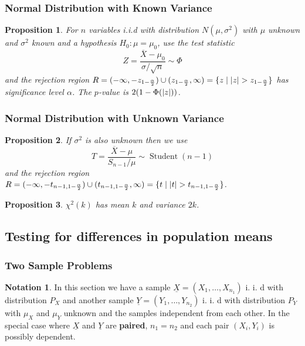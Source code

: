 \documentclass[12pt]{article}
\newtheorem*{prop*}{Proposition}
\theoremstyle{definition}
\newtheorem*{not*}{Notation}
\DeclarePairedDelimiter\abs{\lvert}{\rvert}
\DeclareMathOperator{\Student}{Student}
\begin{document}
\subsubsection{Normal Distribution with Known Variance}

\begin{prop*}
  For $n$ variables i.i.d with distribution $N(\mu, \sigma^2)$ with $\mu$ unknown and $\sigma^2$ known and a hypothesis $H_0 : \mu = \mu_0$, use the test statistic
  $$Z = \frac{\overline{X} - \mu_0}{\sigma / \sqrt{n}} \sim \Phi$$
  and the rejection region $R = (-\infty, -z_{1 - \frac{\alpha}{2}}) \cup (z_{1 - \frac{\alpha}{2}}, \infty) = \{z \mid \abs{z} > z_{1 - \frac{\alpha}{2}}\}$ has significance level $\alpha$.
  The $p$-value is $2(1 - \Phi(\abs{z}))$.
\end{prop*}

\subsubsection{Normal Distribution with Unknown Variance}

\begin{prop*}
  If $\sigma^2$ is also unknown then we use
  $$T = \frac{\overline{X} - \mu}{S_{n - 1} / \mu} \sim \Student(n - 1)$$
  and the rejection region $R = (-\infty, -t_{n - 1, 1 - \frac{\alpha}{2}}) \cup (t_{n - 1, 1 - \frac{\alpha}{2}}, \infty) = \{t \mid \abs{t} > t_{n - 1, 1 - \frac{\alpha}{2}}\}$.
\end{prop*}

\begin{prop*}
  $\chi^2(k)$ has mean $k$ and variance $2k$.
\end{prop*}

\subsection{Testing for differences in population means}

\subsubsection{Two Sample Problems}

\begin{not*}
  In this section we have a sample $\underline{X} = (X_1, \ldots, X_{n_1})$ i. i. d with distribution $P_X$ and another sample $\underline{Y} = (Y_1, \ldots, Y_{n_2})$ i. i. d with distribution $P_Y$ with $\mu_X$ and $\mu_Y$ unknown and the samples independent from each other.
  In the special case where $\underline{X}$ and $\underline{Y}$ are \textbf{paired}, $n_1 = n_2$ and each pair $(X_i, Y_i)$ is possibly dependent.
\end{not*}
\end{document}
